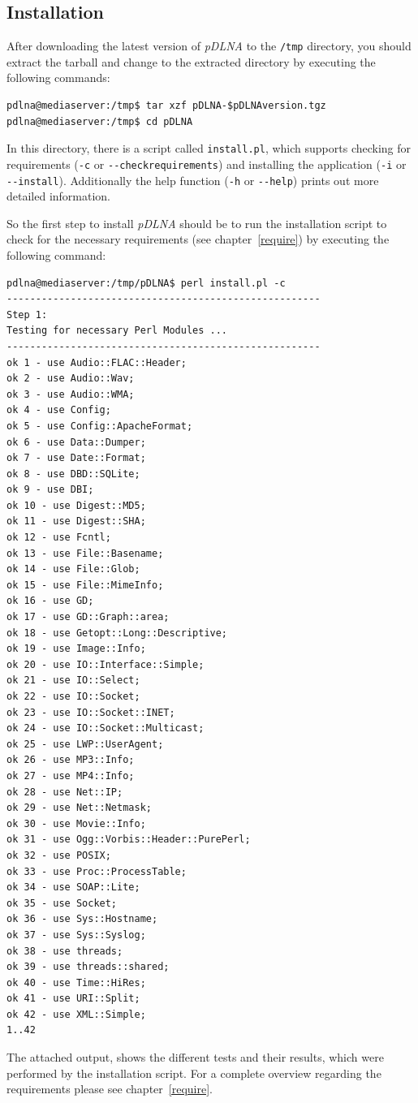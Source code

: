 \documentclass[a4paper,oneside,10pt]{report}
\newenvironment{colframecmd}{%
  \begin{Sbox}
    \begin{minipage}{.99\columnwidth}
}{%
  \end{minipage}
  \end{Sbox}
  \begin{center}
    \fcolorbox{black}{LightSteelBlue}{\TheSbox}
  \end{center}
}
\begin{document}
\subsection{Installation}

After downloading the latest version of {\em pDLNA} to the \verb|/tmp| directory, you should extract the tarball and change to the extracted directory by executing the following commands:
\begin{colframecmd}
\begin{verbatim}
pdlna@mediaserver:/tmp$ tar xzf pDLNA-$pDLNAversion.tgz
pdlna@mediaserver:/tmp$ cd pDLNA
\end{verbatim}
\end{colframecmd}

In this directory, there is a script called \verb|install.pl|, which supports checking for requirements (\verb|-c| or \verb|--checkrequirements|) and installing the application (\verb|-i| or \verb|--install|). Additionally the help function (\verb|-h| or \verb|--help|) prints out more detailed information.

So the first step to install {\em pDLNA} should be to run the installation script to check for the necessary requirements (see chapter~\ref{require}) by executing the following command:
\begin{colframecmd}
\begin{verbatim}
pdlna@mediaserver:/tmp/pDLNA$ perl install.pl -c
------------------------------------------------------
Step 1:
Testing for necessary Perl Modules ...
------------------------------------------------------
ok 1 - use Audio::FLAC::Header;
ok 2 - use Audio::Wav;
ok 3 - use Audio::WMA;
ok 4 - use Config;
ok 5 - use Config::ApacheFormat;
ok 6 - use Data::Dumper;
ok 7 - use Date::Format;
ok 8 - use DBD::SQLite;
ok 9 - use DBI;
ok 10 - use Digest::MD5;
ok 11 - use Digest::SHA;
ok 12 - use Fcntl;
ok 13 - use File::Basename;
ok 14 - use File::Glob;
ok 15 - use File::MimeInfo;
ok 16 - use GD;
ok 17 - use GD::Graph::area;
ok 18 - use Getopt::Long::Descriptive;
ok 19 - use Image::Info;
ok 20 - use IO::Interface::Simple;
ok 21 - use IO::Select;
ok 22 - use IO::Socket;
ok 23 - use IO::Socket::INET;
ok 24 - use IO::Socket::Multicast;
ok 25 - use LWP::UserAgent;
ok 26 - use MP3::Info;
ok 27 - use MP4::Info;
ok 28 - use Net::IP;
ok 29 - use Net::Netmask;
ok 30 - use Movie::Info;
ok 31 - use Ogg::Vorbis::Header::PurePerl;
ok 32 - use POSIX;
ok 33 - use Proc::ProcessTable;
ok 34 - use SOAP::Lite;
ok 35 - use Socket;
ok 36 - use Sys::Hostname;
ok 37 - use Sys::Syslog;
ok 38 - use threads;
ok 39 - use threads::shared;
ok 40 - use Time::HiRes;
ok 41 - use URI::Split;
ok 42 - use XML::Simple;
1..42
\end{verbatim}
\end{colframecmd}
The attached output, shows the different tests and their results, which were performed by the installation script. For a complete overview regarding the requirements please see chapter~\ref{require}.
\end{document}
